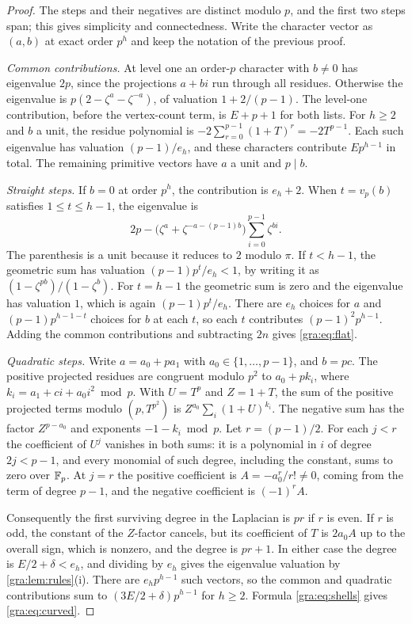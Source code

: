 \begin{proof}
The steps and their negatives are distinct modulo $p$, and the first two
steps span; this gives simplicity and connectedness. Write the character
vector as $(a,b)$ at exact order $p^h$ and keep the notation of the
previous proof.

\emph{Common contributions.} At level one an order-$p$ character with
$b\ne0$ has eigenvalue $2p$, since the projections $a+bi$ run through all
residues. Otherwise the eigenvalue is $p(2-\zeta^a-\zeta^{-a})$, of
valuation $1+2/(p-1)$. The level-one contribution, before the vertex-count
term, is $E+p+1$ for both lists. For $h\ge2$ and $b$ a unit, the residue
polynomial is $-2\sum_{r=0}^{p-1}(1+T)^r=-2T^{p-1}$. Each such eigenvalue
has valuation $(p-1)/e_h$, and these characters contribute $Ep^{h-1}$ in
total. The remaining primitive vectors have $a$ a unit and $p\mid b$.

\emph{Straight steps.} If $b=0$ at order $p^h$, the contribution is
$e_h+2$. When $t=v_p(b)$ satisfies $1\le t\le h-1$, the eigenvalue is
\[
 2p-\bigl(\zeta^a+\zeta^{-a-(p-1)b}\bigr)\sum_{i=0}^{p-1}\zeta^{bi}.
\]
The parenthesis is a unit because it reduces to $2$ modulo $\pi$. If
$t<h-1$, the geometric sum has valuation $(p-1)p^t/e_h<1$, by writing it
as $(1-\zeta^{pb})/(1-\zeta^b)$. For $t=h-1$ the geometric sum is zero and
the eigenvalue has valuation $1$, which is again $(p-1)p^t/e_h$. There are
$e_h$ choices for $a$ and $(p-1)p^{h-1-t}$ choices for $b$ at each $t$, so
each $t$ contributes $(p-1)^2p^{h-1}$. Adding the common contributions and
subtracting $2n$ gives \eqref{gra:eq:flat}.

\emph{Quadratic steps.} Write $a=a_0+pa_1$ with $a_0\in\{1,\dots,p-1\}$,
and $b=pc$. The positive projected residues are congruent modulo $p^2$ to
$a_0+pk_i$, where $k_i=a_1+ci+a_0i^2\bmod p$. With $U=T^p$ and $Z=1+T$,
the sum of the positive projected terms modulo $(p,T^{p^2})$ is
$Z^{a_0}\sum_i(1+U)^{k_i}$. The negative sum has the factor $Z^{p-a_0}$ and
exponents $-1-k_i\bmod p$. Let $r=(p-1)/2$. For each $j<r$ the coefficient
of $U^j$ vanishes in both sums: it is a polynomial in $i$ of degree
$2j<p-1$, and every monomial of such degree, including the constant, sums
to zero over $\mathbb{F}_p$. At $j=r$ the positive coefficient is
$A=-a_0^r/r!\ne0$, coming from the term of degree $p-1$, and the negative
coefficient is $(-1)^rA$.

Consequently the first surviving degree in the Laplacian is $pr$ if $r$ is
even. If $r$ is odd, the constant of the $Z$-factor cancels, but its
coefficient of $T$ is $2a_0A$ up to the overall sign, which is nonzero, and
the degree is $pr+1$. In either case the degree is $E/2+\delta<e_h$, and
dividing by $e_h$ gives the eigenvalue valuation by
\cref{gra:lem:rules}(i). There are $e_hp^{h-1}$ such vectors, so the common
and quadratic contributions sum to $(3E/2+\delta)p^{h-1}$ for $h\ge2$.
Formula \eqref{gra:eq:shells} gives \eqref{gra:eq:curved}.
\end{proof}

